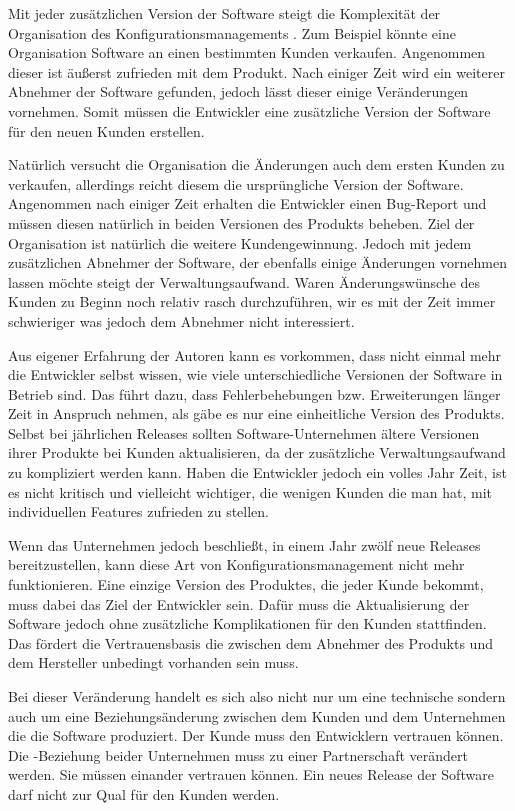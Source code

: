 Mit jeder zusätzlichen Version der Software steigt die Komplexität der Organisation des Konfigurationsmanagements \cite{dpunktkonfig2008}. Zum Beispiel könnte eine Organisation Software an einen bestimmten Kunden verkaufen. Angenommen dieser ist äußerst zufrieden mit dem Produkt. Nach einiger Zeit wird ein weiterer Abnehmer der Software gefunden, jedoch lässt dieser einige Veränderungen vornehmen. Somit müssen die Entwickler eine zusätzliche Version der Software für den neuen Kunden erstellen. 

Natürlich versucht die Organisation die Änderungen auch dem ersten Kunden zu verkaufen, allerdings reicht diesem die ursprüngliche Version der Software. Angenommen nach einiger Zeit erhalten die Entwickler einen Bug-Report und müssen diesen natürlich in beiden Versionen des Produkts beheben. Ziel der Organisation ist natürlich die weitere Kundengewinnung. Jedoch mit jedem zusätzlichen Abnehmer der Software, der ebenfalls einige Änderungen vornehmen lassen möchte steigt der Verwaltungsaufwand. Waren Änderungswünsche des Kunden zu Beginn noch relativ rasch durchzuführen, wir es mit der Zeit immer schwieriger was jedoch dem Abnehmer nicht interessiert.

Aus eigener Erfahrung der Autoren kann es vorkommen, dass nicht einmal mehr die Entwickler selbst wissen, wie viele unterschiedliche Versionen der Software in Betrieb sind. Das führt dazu, dass Fehlerbehebungen bzw. Erweiterungen länger Zeit in Anspruch nehmen, als gäbe es nur eine einheitliche Version des Produkts. Selbst bei jährlichen Releases sollten Software-Unternehmen ältere Versionen ihrer Produkte bei Kunden aktualisieren, da der zusätzliche Verwaltungsaufwand zu kompliziert werden kann. Haben die Entwickler jedoch ein volles Jahr Zeit, ist es nicht kritisch und vielleicht wichtiger, die wenigen Kunden die man hat, mit individuellen Features zufrieden zu stellen.

Wenn das Unternehmen jedoch beschließt, in einem Jahr zwölf neue Releases bereitzustellen, kann diese Art von Konfigurationsmanagement nicht mehr funktionieren. Eine einzige Version des Produktes, die jeder Kunde bekommt, muss dabei das Ziel der Entwickler sein. Dafür muss die Aktualisierung der Software jedoch ohne zusätzliche Komplikationen für den Kunden stattfinden. Das fördert die Vertrauensbasis die zwischen dem Abnehmer des Produkts und dem Hersteller unbedingt vorhanden sein muss.

Bei dieser Veränderung handelt es sich also nicht nur um eine technische sondern auch um eine Beziehungsänderung zwischen dem Kunden und dem Unternehmen die die Software produziert. Der Kunde muss den Entwicklern vertrauen können. Die -Beziehung beider Unternehmen muss zu einer Partnerschaft verändert werden. Sie müssen einander vertrauen können. Ein neues Release der Software darf nicht zur Qual für den Kunden werden. 

